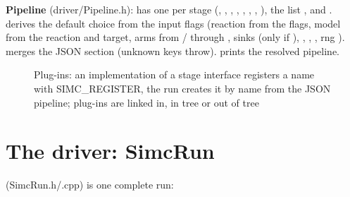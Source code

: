 \textbf{Pipeline} (driver/\allowbreak{}Pipeline.\allowbreak{}h):  has one  per stage (, , ,
, , , , ), the list , and .
 derives the default choice from the input flags (reaction from the  flags,
model from the reaction and target, arms from / through , sinks
 (only if ), , , , rng ).  merges the JSON
 section (unknown keys throw).  prints the resolved pipeline.

\begin{figure}[htbp]
\caption[Plug-ins]{Plug-ins: an implementation of a stage interface registers a name with SIMC\_\allowbreak{}REGISTER,\allowbreak{} the run creates it by name from the JSON pipeline; plug-ins are linked in, in tree or out of tree}\label{fig:pluginu5fregistry}
\end{figure}
\section{\texorpdfstring{The driver: SimcRun}{The driver: SimcRun}}\label{developer_manual-03u5farchitecture:33-the-driver-simcrun}
 (SimcRun.\allowbreak{}h/\allowbreak{}.cpp) is one complete run:

